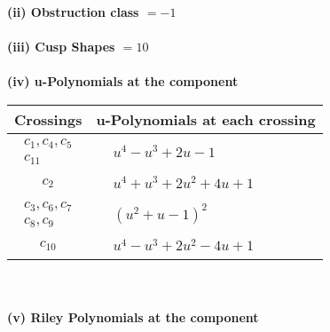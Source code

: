 \documentclass[1p]{elsarticle_modified}
\theoremstyle{definition}
\begin{document}
\flushleft \textbf{(ii) Obstruction class $= -1$}\\~\\
\flushleft \textbf{(iii) Cusp Shapes $= 10$}\\~\\
\newpage\renewcommand{\arraystretch}{1}
\flushleft \textbf{(iv) u-Polynomials at the component}\newline \\
\begin{tabular}{m{50pt}|m{274pt}}
Crossings & \hspace{64pt}u-Polynomials at each crossing \\
\hline $$\begin{aligned}c_{1},c_{4},c_{5}\\c_{11}\end{aligned}$$&$\begin{aligned}
&u^4- u^3+2 u-1
\end{aligned}$\\
\hline $$\begin{aligned}c_{2}\end{aligned}$$&$\begin{aligned}
&u^4+u^3+2 u^2+4 u+1
\end{aligned}$\\
\hline $$\begin{aligned}c_{3},c_{6},c_{7}\\c_{8},c_{9}\end{aligned}$$&$\begin{aligned}
&(u^2+u-1)^2
\end{aligned}$\\
\hline $$\begin{aligned}c_{10}\end{aligned}$$&$\begin{aligned}
&u^4- u^3+2 u^2-4 u+1
\end{aligned}$\\
\hline
\end{tabular}\\~\\
\newpage\renewcommand{\arraystretch}{1}
\flushleft \textbf{(v) Riley Polynomials at the component}\newline \\
\end{document}

